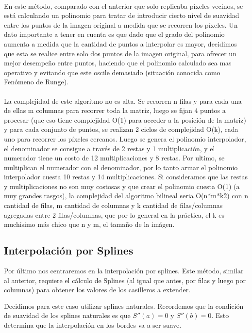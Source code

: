 \\
En este método, comparado con el anterior que solo replicaba píxeles vecinos, se está calculando un polinomio para tratar de introducir cierto nivel de suavidad entre los puntos de la imagen original a medida que se recorren los píxeles. Un dato importante a tener en cuenta es que dado que el grado del polinomio aumenta a medida que la cantidad de puntos a interpolar es mayor, decidimos que esta se realice entre solo dos puntos de la imagen original, para ofrecer un mejor desempe\~no entre puntos, haciendo que el polinomio calculado sea mas operativo y evitando que este oscile demasiado (situación conocida como Fenómeno de Runge). 
\\ \\
La complejidad de este algoritmo no es alta. Se recorren n filas y para cada una de ellas m columnas para recorrer toda la matriz, luego se fijan 4 puntos a procesar (que eso tiene complejidad O(1) para acceder a la posición de la matriz) y para cada conjunto de puntos, se realizan 2 ciclos de complejidad O(k), cada uno para recorrer los píxeles cercanos. Luego se genera el polinomio interpolador, el denominador se consigue a través de 2 restas y 1 multiplicación, y el numerador tiene un costo de 12 multiplicaciones y 8 restas. Por ultimo, se multiplican el numerador con el denominador, por lo tanto armar el polinomio interpolador cuesta 10 restas y 14 multiplicaciones.
Si consideramos que las restas y multiplicaciones no son muy costosas y que crear el polinomio cuesta O(1) (a muy grandes rasgos), la complejidad del algoritmo bilineal seria O(n*m*k\^{2}) con n cantidad de filas, m cantidad de columnas y k cantidad de filas/columnas agregadas entre 2 filas/columnas, que por lo general en la práctica, el k es muchisimo más chico que n y m, el tamaño de la imágen.


\subsection{Interpolación por Splines}
Por último nos centraremos en la interpolación por splines. Este método, similar al anterior, requiere el cálculo de Splines (al igual que antes, por filas y luego por columnas) para obtener los valores de los casilleros a extender.

Decidimos para este caso utilizar splines naturales. Recordemos que la condición de suavidad de los splines naturales es que $S''(a) = 0$ y $S''(b) = 0$. Esto determina que la interpolación en los bordes va a ser suave.

